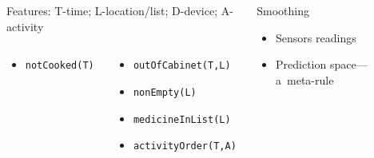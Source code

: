 \documentclass[10pt]{beamer}
\begin{document}
\begin{frame}
\begin{columns}
\begin{column}{8cm}
\begin{block}{Features: T-time; L-location/list; D-device; A-activity}
\begin{columns}
\begin{column}{4cm}
\begin{itemize}
          \item \texttt{notCooked(T)}
        \end{itemize}
        \end{column}

        \begin{column}{5cm}
        \begin{itemize}
          \item \texttt{outOfCabinet(T,L)}
          \item \texttt{nonEmpty(L)}
          \item \texttt{medicineInList(L)}

          \item \texttt{activityOrder(T,A)}
        \end{itemize}
        \end{column}        
      \end{columns}


      \end{block}
    \end{column}

    \begin{column}{3.5cm}
      \begin{block}{Smoothing}
        \begin{itemize}
          \item Sensors readings
          \item Prediction space--- a~meta-rule
        \end{itemize}
      \end{block}
    \end{column}

  \end{columns}

\end{frame} %
\end{document}
